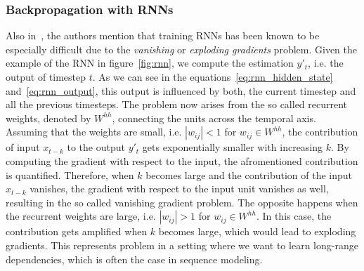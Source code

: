 \subsubsection{Backpropagation with RNNs}
Also in~\cite{rnn_survey}, the authors mention that training RNNs has been known to be especially difficult due to the \emph{vanishing} or \emph{exploding gradients} problem.
Given the example of the RNN in figure~\ref{fig:rnn}, we compute the estimation $y'_t$, i.e. the output of timestep $t$.
As we can see in the equations~\ref{eq:rnn_hidden_state} and~\ref{eq:rnn_output}, this output is influenced by both, the current timestep and all the previous timesteps.
The problem now arises from the so called recurrent weights, denoted by $W^{hh}$, connecting the units across the temporal axis.
Assuming that the weights are small, i.e. $|w_{ij}| < 1$ for $w_{ij} \in W^{hh}$, the contribution of input $x_{t-k}$ to the output $y'_t$ gets exponentially smaller with increasing $k$.
By computing the gradient with respect to the input, the afromentioned contribution is quantified.
Therefore, when $k$ becomes large and the contribution of the input $x_{t-k}$ vanishes, the gradient with respect to the input unit vanishes as well, resulting in the so called vanishing gradient problem.
The opposite happens when the recurrent weights are large, i.e. $|w_{ij}| > 1$ for $w_{ij} \in W^{hh}$.
In this case, the contribution gets amplified when $k$ becomes large, which would lead to exploding gradients.
This represents problem in a setting where we want to learn long-range dependencies, which is often the case in sequence modeling.

